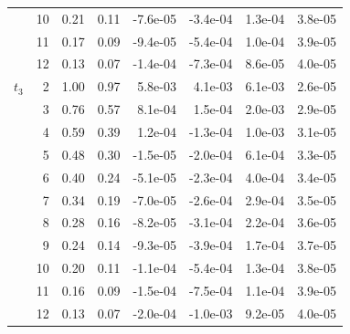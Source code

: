 \begin{table}
\begin{tabular}{lrrrrrrr}
 & 10 & 0.21 & 0.11 & -7.6e-05 & -3.4e-04 & 1.3e-04 & 3.8e-05 \\
 & 11 & 0.17 & 0.09 & -9.4e-05 & -5.4e-04 & 1.0e-04 & 3.9e-05 \\
 & 12 & 0.13 & 0.07 & -1.4e-04 & -7.3e-04 & 8.6e-05 & 4.0e-05 \\
$t_3$ & 2 & 1.00 & 0.97 & 5.8e-03 & 4.1e-03 & 6.1e-03 & 2.6e-05 \\
 & 3 & 0.76 & 0.57 & 8.1e-04 & 1.5e-04 & 2.0e-03 & 2.9e-05 \\
 & 4 & 0.59 & 0.39 & 1.2e-04 & -1.3e-04 & 1.0e-03 & 3.1e-05 \\
 & 5 & 0.48 & 0.30 & -1.5e-05 & -2.0e-04 & 6.1e-04 & 3.3e-05 \\
 & 6 & 0.40 & 0.24 & -5.1e-05 & -2.3e-04 & 4.0e-04 & 3.4e-05 \\
 & 7 & 0.34 & 0.19 & -7.0e-05 & -2.6e-04 & 2.9e-04 & 3.5e-05 \\
 & 8 & 0.28 & 0.16 & -8.2e-05 & -3.1e-04 & 2.2e-04 & 3.6e-05 \\
 & 9 & 0.24 & 0.14 & -9.3e-05 & -3.9e-04 & 1.7e-04 & 3.7e-05 \\
 & 10 & 0.20 & 0.11 & -1.1e-04 & -5.4e-04 & 1.3e-04 & 3.8e-05 \\
 & 11 & 0.16 & 0.09 & -1.5e-04 & -7.5e-04 & 1.1e-04 & 3.9e-05 \\
 & 12 & 0.13 & 0.07 & -2.0e-04 & -1.0e-03 & 9.2e-05 & 4.0e-05 \\
\bottomrule
\end{tabular}
\end{table}
